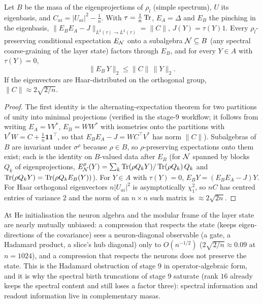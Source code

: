 \begin{theorem}[Complementarity]\label{thm:complement}
Let $B$ be the masa of the eigenprojections of $\rho_l$ (simple spectrum), $U$ its eigenbasis, and
$C_{ai}=|U_{ai}|^2-\tfrac1n$. With $\tau=\tfrac1n\operatorname{Tr}$, $E_A=\Delta$ and $E_B$ the pinching in the eigenbasis,
$\|E_BE_A-J\|_{L^2(\tau)\to L^2(\tau)}=\|C\|$, $J(Y)=\tau(Y)1$. Every $\rho_l$-preserving conditional expectation $E_\mathcal N$
onto a subalgebra $\mathcal N\subseteq B$ (any spectral coarse-graining of the layer state) factors through $E_B$, and for
every $Y\in A$ with $\tau(Y)=0$,
\[
\|E_B\,Y\|_2\le\|C\|\,\|Y\|_2 .
\]
If the eigenvectors are Haar-distributed on the orthogonal group, $\|C\|\approx2\sqrt{2/n}$.
\end{theorem}
\begin{proof}
The first identity is the alternating-expectation theorem for two partitions of unity into minimal projections
(verified in the stage-9 workflow; it follows from writing $E_A=VV^*$, $E_B=WW^*$ with isometries onto the partitions
with $V^*W=C+\tfrac1n\mathbf 1\mathbf 1^{\top}$, so that $E_BE_A-J=WC^{\top}V^*$ has norm $\|C\|$). Subalgebras of $B$ are invariant under
$\sigma^{\rho}$ because $\rho\in B$, so $\rho$-preserving expectations onto them exist; each is the identity on $B$-valued
data after $E_B$ (for $\mathcal N$ spanned by blocks $Q_k$ of eigenprojections, $E^\rho_\mathcal N(Y)=\sum_k\operatorname{Tr}(\rho Q_kY)/\operatorname{Tr}(\rho Q_k)\,Q_k$ and
$\operatorname{Tr}(\rho Q_kY)=\operatorname{Tr}(\rho Q_kE_B(Y))$). For $Y\in A$ with $\tau(Y)=0$, $E_BY=(E_BE_A-J)Y$. For Haar orthogonal eigenvectors $n|U_{ai}|^2$ is asymptotically $\chi^2_1$, so $nC$ has
centred entries of variance $2$ and the norm of an $n\times n$ such matrix is $\approx2\sqrt{2n}$.
\end{proof}

At He initialisation the neuron algebra and the modular frame of the layer state are nearly mutually unbiased: a
compression that respects the state (keeps eigen-directions of the covariance) sees a neuron-diagonal observable
(a gate, a Hadamard product, a slice's hub diagonal) only to $O(n^{-1/2})$ ($2\sqrt{2/n}\approx0.09$ at $n=1024$), and a compression that respects the
neurons does not preserve the state. This is the Hadamard obstruction of stage 9 in operator-algebraic form, and it
is why the spectral birth truncations of stage 9 saturate (rank $16$ already keeps the spectral content and still
loses a factor three): spectral information and readout information live in complementary masas.

